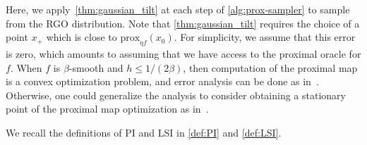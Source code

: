 


Here, we apply~\cref{thm:gaussian_tilt} at each step of \cref{alg:prox-sampler} to sample from the RGO distribution.
Note that \cref{thm:gaussian_tilt} requires the choice of a point $x_+$ which is close to $\text{prox}_{\eta f}(x_0)$.
For simplicity, we assume that this error is zero, which amounts to assuming that we have access to the proximal oracle for $f$.
When $f$ is $\beta$-smooth and $h\le 1/(2\beta)$, then computation of the proximal map is a convex optimization problem, and error analysis can be done as in~\citet{AltChe24Warm}.
Otherwise, one could generalize the analysis to consider obtaining a stationary point of the proximal map optimization as in~\citet{FanYuaChe23ImprovedProx}.

We recall the definitions of PI and LSI in \cref{def:PI} and \cref{def:LSI}.

